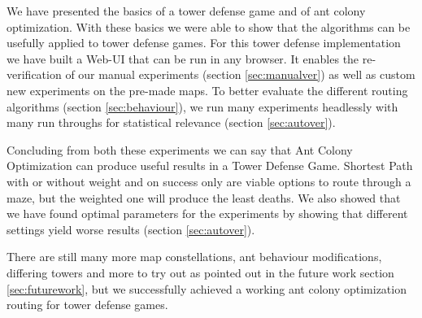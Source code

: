 We have presented the basics of a tower defense game and of ant colony optimization. With these basics we were able to show that the algorithms can be usefully applied to tower defense games.
For this tower defense implementation we have built a Web-UI that can be run in any browser. It enables the re-verification of our manual experiments (section \ref{sec:manualver}) as well as custom new experiments on the pre-made maps.
To better evaluate the different routing algorithms (section \ref{sec:behaviour}), we run many experiments headlessly with many run throughs for statistical relevance (section \ref{sec:autover}).

Concluding from both these experiments we can say that Ant Colony Optimization can produce useful results in a Tower Defense Game. Shortest Path with or without weight and on success only are viable options to route through a maze, but the weighted one will produce the least deaths. We also showed that we have found optimal parameters for the experiments by showing that different settings yield worse results (section \ref{sec:autover}).

There are still many more map constellations, ant behaviour modifications, differing towers and more to try out as pointed out in the future work section \ref{sec:futurework}, but we successfully achieved a working ant colony optimization routing for tower defense games.
